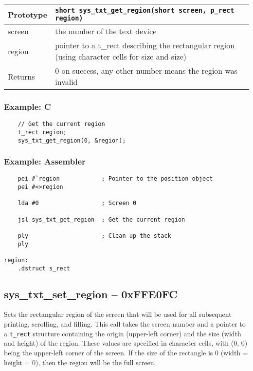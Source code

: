 \bigskip

\begin{tabular}{|l||l|} \hline
Prototype & \lstinline!short sys_txt_get_region(short screen, p_rect region)! \\ \hline
screen & the number of the text device \\ \hline
region & pointer to a t\_rect describing the rectangular region (using character cells for size and size) \\ \hline
Returns & 0 on success, any other number means the region was invalid \\ \hline
\end{tabular}

\subsubsection*{Example: C}
\begin{lstlisting}
    // Get the current region
    t_rect region;
    sys_txt_get_region(0, &region);
\end{lstlisting}

\subsubsection*{Example: Assembler}
\begin{verbatim}
    pei #`region            ; Pointer to the position object
    pei #<>region

    lda #0                  ; Screen 0

    jsl sys_txt_get_region  ; Get the current region

    ply                     ; Clean up the stack
    ply

region:
    .dstruct s_rect
\end{verbatim}


\subsection*{sys\_txt\_set\_region -- 0xFFE0FC}
Sets the rectangular region of the screen that will be used for all subsequent printing, scrolling, and filling. This call takes the screen number and a pointer to a \verb+t_rect+ structure containing the origin (upper-left corner) and the size (width and height) of the region. These values are specified in character cells, with (0, 0) being the upper-left corner of the screen. If the size of the rectangle is 0 (width = height = 0), then the region will be the full screen.

